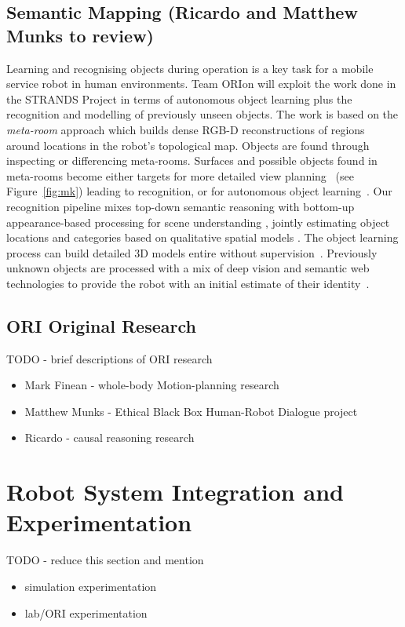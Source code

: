 \documentclass[runningheads,a4paper]{llncs}
\newcommand{\teamori}{Team ORIon}
\begin{document}
\subsection{Semantic Mapping (Ricardo and Matthew Munks to review)}

Learning and recognising objects during operation is a key task for a mobile service robot in human environments. \teamori{} will exploit the work done in the STRANDS Project in terms of autonomous object learning plus the recognition and modelling of previously unseen objects. The work is based on the \emph{meta-room} approach which builds dense RGB-D reconstructions of regions around locations in the robot's topological map. Objects are found through inspecting or differencing meta-rooms. Surfaces and possible objects found in meta-rooms become either targets for more detailed view planning~\cite{kunze14indirect} (see Figure~\ref{fig:mk}) leading to recognition, or for autonomous object learning~\cite{Faeulhammer:2016}. Our recognition pipeline mixes top-down semantic reasoning with bottom-up appearance-based processing for scene understanding \cite{kunze14topdown}, jointly estimating object locations and categories based on qualitative spatial models \cite{kunze14bootstrapping}. The object learning process can build detailed 3D models entire without supervision~\cite{Faeulhammer:2016}. Previously unknown  objects are processed with a mix of deep vision and semantic web technologies to provide the robot with an initial estimate of their identity~\cite{aloof@icra17}.

\subsection{ORI Original Research}
TODO - brief descriptions of ORI research
\begin{itemize}
	\item Mark Finean - whole-body Motion-planning research
	\item Matthew Munks - Ethical Black Box Human-Robot Dialogue project
	\item Ricardo - causal reasoning research
\end{itemize}


\section{Robot System Integration and Experimentation}
TODO - reduce this section and mention
\begin{itemize}
	\item simulation experimentation
	\item lab/ORI experimentation
\end{itemize}
\end{document}
